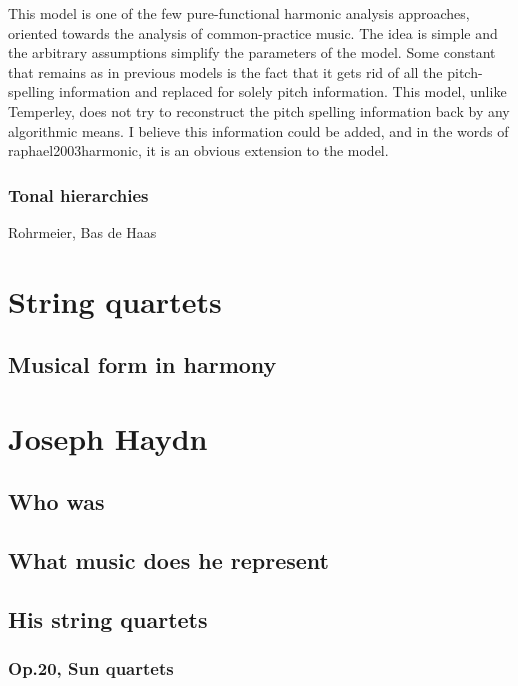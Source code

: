     This model is one of the few pure-functional harmonic analysis approaches, oriented towards the analysis of common-practice music. The idea is simple and the arbitrary assumptions simplify the parameters of the model. Some constant that remains as in previous models is the fact that it gets rid of all the pitch-spelling information and replaced for solely pitch information. This model, unlike Temperley, does not try to reconstruct the pitch spelling information back by any algorithmic means. I believe this information could be added, and in the words of raphael2003harmonic, it is an obvious extension to the model.

    \subsubsection{Tonal hierarchies}
    Rohrmeier, Bas de Haas
\section{String quartets}
  \subsection{Musical form in harmony}
\section{Joseph Haydn}
  \subsection{Who was}
  \subsection{What music does he represent}
  \subsection{His string quartets}
    \subsubsection{Op.20, Sun quartets}

\newpage
